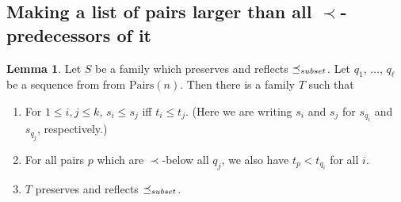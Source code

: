 \documentclass[12pt]{article}
\theoremstyle{definition}
\newtheorem{lemma}[theorem]{Lemma}
\newcommand{\Pairs}{\mbox{Pairs}}
\newcommand{\precsubseteq}{\preceq_{\scriptsize subset}}
\begin{document}
\subsection{Making a list of pairs larger than all $\prec$-predecessors
of it}
\begin{lemma}
Let $S$ be a family which  preserves and reflects $\precsubseteq$.  
Let $q_1$, $\ldots$, $q_{\ell}$ be a sequence from 
from $\Pairs(n)$.  
Then there is a family $T$ such that
\begin{enumerate} 
    \item For $1\leq i,j \leq k$, $s_i \leq s_j$ iff $t_i \leq t_j$.
    (Here we are writing $s_i$ and $s_j$ for $s_{q_i}$ and $s_{q_j}$, respectively.)
    \label{competitor1}
    \item For all 
pairs $p $ which are $\prec$-below all $q_j$, we also have 
$t_{p}  <  t_{q_i}$ for all $i$.
\label{competitor2}
  \item $T$ preserves and reflects $\precsubseteq$. 

\end{enumerate}
\label{lemma-competitor-subset}
\end{lemma}
 
\end{document}
